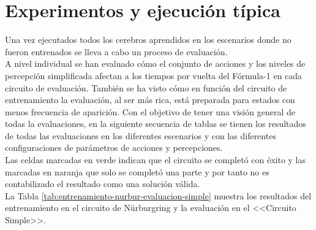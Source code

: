 \newpage
\section{Experimentos y ejecución típica}

Una vez ejecutados todos los cerebros aprendidos en los escenarios donde no fueron entrenados se lleva a cabo un proceso de evaluación.\\

A nivel individual se han evaluado cómo el conjunto de acciones y los niveles de percepción simplificada  afectan a los tiempos por vuelta del Fórmula-1 en cada circuito de evaluación. También se ha visto cómo en función del circuito de entrenamiento la evaluación, al ser más rica, está preparada para estados con menos frecuencia de aparición. Con el objetivo de tener una visión general de todas la evaluaciones, en la siguiente secuencia de tablas se tienen los resultados de todas las evaluaciones en los diferentes escenarios y con las diferentes configuraciones de parámetros de acciones y percepciones.\\

Las celdas marcadas en verde indican que el circuito se completó con éxito y las marcadas en naranja que solo se completó una parte y por tanto no es contabilizado el resultado como una solución válida.\\

La Tabla \ref{tab:entrenamiento-nurbur-evaluacion-simple} muestra los resultados del entrenamiento en el circuito de Nürburgring y la evaluación en el <<Circuito Simple>>.\\

